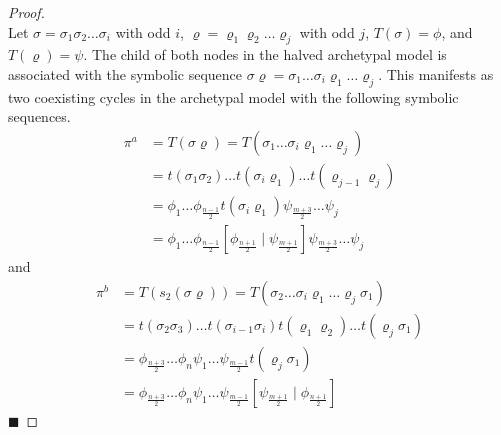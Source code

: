 \begin{proof} \phantom{x} \\
	Let $\sigma = \sigma_1\sigma_2 \dots \sigma_i$ with odd $i$, $\varrho = \varrho_1\varrho_2 \dots \varrho_j$ with odd $j$, $T(\sigma) = \phi$, and $T(\varrho) = \psi$.
	The child of both nodes in the halved archetypal model is associated with the symbolic sequence $\sigma\varrho = \sigma_1 \dots \sigma_i \varrho_1 \dots \varrho_j$.
	This manifests as two coexisting cycles in the archetypal model with the following symbolic sequences.
	\begin{align*}
		\pi^a & = T(\sigma\varrho) = T(\sigma_1 \dots \sigma_i \varrho_1 \dots \varrho_j)                                                         \\
		      & = t(\sigma_1\sigma_2) \dots t(\sigma_i\varrho_1) \dots t(\varrho_{j-1}\varrho_j)                                                  \\
		      & = \phi_1 \dots \phi_{\frac{n-1}{2}} t(\sigma_i\varrho_1) \psi_{\frac{m+3}{2}} \dots \psi_j                                        \\
		      & = \phi_1 \dots \phi_{\frac{n-1}{2}} \left[\phi_{\frac{n+1}{2}} \mid \psi_{\frac{m+1}{2}}\right] \psi_{\frac{m+3}{2}} \dots \psi_j
	\end{align*}
	and
	\begin{align*}
		\pi^b & = T(s_2(\sigma\varrho)) = T(\sigma_2 \dots \sigma_i \varrho_1 \dots \varrho_j \sigma_1)                                           \\
		      & = t(\sigma_2\sigma_3) \dots t(\sigma_{i-1}\sigma_i) t(\varrho_1\varrho_2) \dots t(\varrho_j\sigma_1)                              \\
		      & = \phi_{\frac{n+3}{2}} \dots \phi_n \psi_1 \dots \psi_{\frac{m-1}{2}} t(\varrho_j\sigma_1)                                        \\
		      & = \phi_{\frac{n+3}{2}} \dots \phi_n \psi_1 \dots \psi_{\frac{m-1}{2}} \left[\psi_{\frac{m+1}{2}} \mid \phi_{\frac{n+1}{2}}\right]
	\end{align*}
	\hfill $\blacksquare$
\end{proof}


